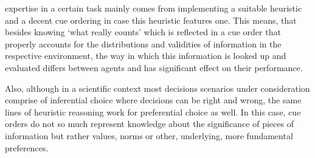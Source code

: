expertise in a certain task mainly comes from implementing a suitable heuristic and a decent cue ordering in case this heuristic features one. This means, that besides knowing `what really counts' which is reflected in a cue order that properly accounts for the distributions and validities of information in the respective environment, the way in which this information is looked up and evaluated differs between agents and has significant effect on their performance.

Also, although in a scientific context most decisions scenarios under consideration comprise of inferential choice where decisions can be right and wrong, the same lines of heuristic reasoning work for preferential choice as well. In this case, cue orders do not so much represent knowledge about the significance of pieces of information but rather values, norms or other, underlying, more fundamental preferences.


